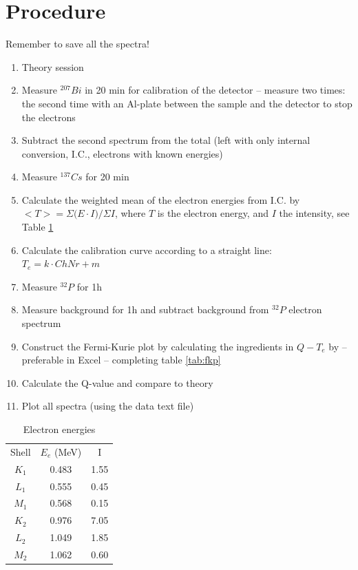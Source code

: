 \documentclass[a4,11pt, notitlepage]{article}
\begin{document}
\section{Procedure}
Remember to save all the spectra!
\begin{enumerate}
\item Theory session 
\item Measure $^{207}Bi$ in 20 min for calibration of the detector -- measure two times: the second time with an Al-plate between the sample and the detector to stop the electrons 
\item Subtract the second spectrum from the total (left with only internal conversion, I.C., electrons with known energies)
\item Measure $^{137}Cs$ for 20 min
\item Calculate the weighted mean of the electron energies from I.C. by $<T>=\Sigma{(E\cdot I})/\Sigma{I}$, where $T$ is the electron energy, and $I$ the intensity, see Table \ref{tab:calib}
\item Calculate the calibration curve according to a straight line: $T_e=k\cdot ChNr+m$ 
\item  Measure $^{32}P$ for 1h 
\item Measure background for 1h and subtract background from $^{32}P$ electron spectrum
\item Construct the Fermi-Kurie plot by calculating the ingredients in $Q-T_e$ by -- preferable in Excel -- completing table \ref{tab:fkp}

\item Calculate the Q-value and compare to theory
\item Plot all spectra (using the data text file)

\end{enumerate}

\begin{table}[]
\caption{Electron energies}
\label{tab:calib}
\centering
\begin{tabular}{ccc}
Shell & $E_{e}$ (MeV) & I \\
$K_1$ & 0.483 & 1.55 \\
$L_1$ & 0.555 & 0.45 \\
$M_1$ & 0.568 & 0.15 \\
$K_2$ & 0.976 & 7.05 \\
$L_2$ & 1.049 & 1.85 \\
$M_2$ & 1.062 & 0.60 
\end{tabular}
\end{table}
\end{document}
